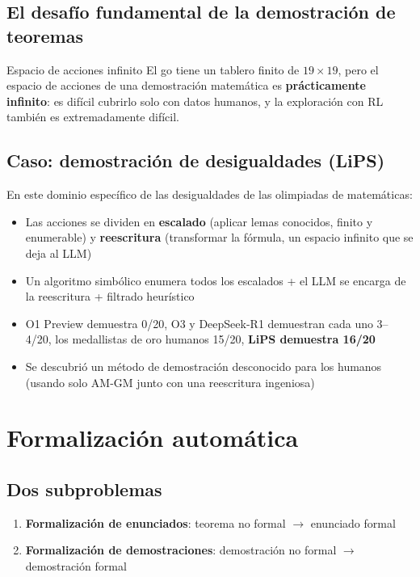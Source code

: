 \documentclass[a4paper]{article}
\begin{document}
\subsection{El desafío fundamental de la demostración de teoremas}

\begin{warningbox}{Espacio de acciones infinito}
El go tiene un tablero finito de $19\times19$, pero el espacio de acciones de una demostración matemática es \textbf{prácticamente infinito}: es difícil cubrirlo solo con datos humanos, y la exploración con RL también es extremadamente difícil.
\end{warningbox}

\subsection{Caso: demostración de desigualdades (LiPS)}

En este dominio específico de las desigualdades de las olimpiadas de matemáticas:
\begin{itemize}
    \item Las acciones se dividen en \textbf{escalado} (aplicar lemas conocidos, finito y enumerable) y \textbf{reescritura} (transformar la fórmula, un espacio infinito que se deja al LLM)
    \item Un algoritmo simbólico enumera todos los escalados + el LLM se encarga de la reescritura + filtrado heurístico
    \item O1 Preview demuestra 0/20, O3 y DeepSeek-R1 demuestran cada uno 3--4/20, los medallistas de oro humanos 15/20, \textbf{LiPS demuestra 16/20}
    \item Se descubrió un método de demostración desconocido para los humanos (usando solo AM-GM junto con una reescritura ingeniosa)
\end{itemize}
\section{Formalización automática}

\subsection{Dos subproblemas}

\begin{enumerate}
    \item \textbf{Formalización de enunciados}: teorema no formal $\to$ enunciado formal
    \item \textbf{Formalización de demostraciones}: demostración no formal $\to$ demostración formal
\end{enumerate}
\end{document}
